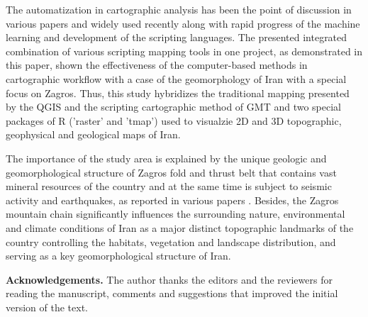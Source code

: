\documentclass[12pt,a4paper,oneside]{article}
\def \newsection{\vspace{12pt}\textbf}
\def \newpar{\vspace{6pt}}
\begin{document}
\newpar The automatization in cartographic analysis has been the point of discussion in various papers \citep{Schenke,Lemenkova2019c,Gauger} and widely used recently along with rapid progress of the machine learning and development of the scripting languages. The presented integrated combination of various scripting mapping tools in one project, as demonstrated in this paper, shown the effectiveness of the computer-based methods in cartographic workflow with a case of the geomorphology of Iran with a special focus on Zagros. Thus, this study hybridizes the traditional mapping presented by the QGIS and the scripting cartographic method of GMT and two special packages of R ('raster' and 'tmap') used to visualzie 2D and 3D topographic,  geophysical and geological maps of Iran. 

\newpar The importance of the study area is explained by the unique geologic and geomorphological structure of Zagros fold and thrust belt that contains vast mineral resources of the country \citep{Sepehr,Regard,Motaghi2017,Saura} and at the same time is subject to seismic activity and earthquakes, as reported in various papers \citep{Paul,Nissen,Yamini,Tavakoli,Talebian}. Besides, the Zagros mountain chain significantly influences the surrounding nature, environmental and climate conditions of Iran as a major distinct topographic landmarks of the country controlling the habitats, vegetation and landscape distribution, and serving as a key geomorphological structure of Iran. 

\vspace{12pt}

{\bf Acknowledgements.} The author thanks the editors and the reviewers for reading the manuscript, comments and suggestions that improved the initial version of the text.


%
%
%


\end{document}
